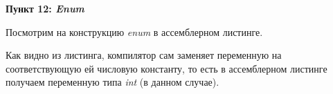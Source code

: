 \documentclass[a4paper,12pt]{article}
\begin{document}
\textbf{Пункт 12: \textit{Enum}}

Посмотрим на конструкцию \textit{enum} в ассемблерном листинге.

\begin{figure}[H]\label{fig: Enum код и листинг}
\end{figure}
Как видно из листинга, компилятор сам заменяет переменную на соответствующую ей числовую константу, то есть в ассемблерном листинге получаем переменную типа \textit{int} (в данном случае). 
\end{document}
